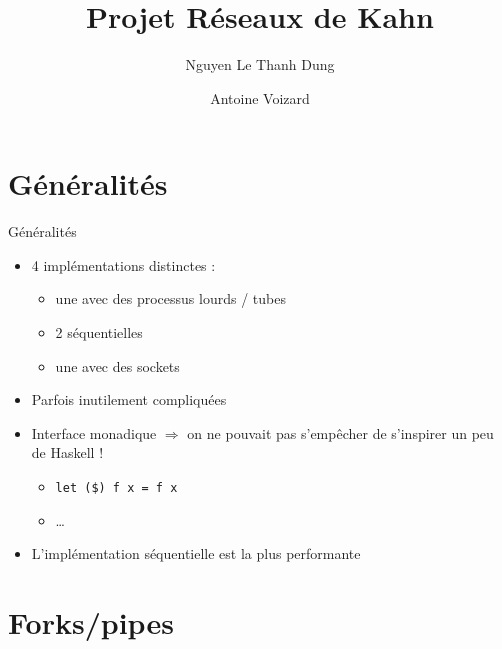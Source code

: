 \documentclass[xetex]{beamer}
\title{Projet Réseaux de Kahn}
\author[Nguyen, Voizard]{Nguyen Le Thanh Dung \and Antoine Voizard}
\institute[ENS]{\'Ecole Normale Supérieure}
\begin{document}
\begin{frame}
  \titlepage
\end{frame}


\section{Généralités}

\begin{frame}{Généralités}
  \begin{itemize}
  \item 4 implémentations distinctes :
    \begin{itemize}
    \item une avec des processus lourds / tubes
    \item 2 séquentielles
    \item une avec des sockets
    \end{itemize}
  \item Parfois inutilement compliquées
  \item Interface monadique $\Rightarrow$ on ne pouvait pas s'empêcher
    de s'inspirer un peu de Haskell !
    \begin{itemize}
    \item \texttt{let (\$) f x = f x}
    \item \ldots
    \end{itemize}
  \item L'implémentation séquentielle est la plus performante
  \end{itemize}
\end{frame}

\section{Forks/pipes}

\begin{frame}[c]
  \begin{center}
    \Huge \insertsection
  \end{center}
\end{frame}
\end{document}
